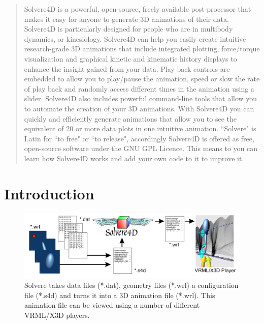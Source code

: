 \documentclass[singlecolumn,12pt]{article}
\begin{document}
\newpage
\begin{abstract}
Solvere4D is a powerful, open-source, freely available
post-processor that makes it easy for anyone to generate 3D
animations of their data. Solvere4D is particularly designed for
people who are in multibody dynamics, or kinesiology. Solvere4D can
help you easily create intuitive research-grade 3D animations that
include integrated plotting, force/torque visualization and
graphical kinetic and kinematic history displays to enhance the
insight gained from your data. Play back controls are embedded to
allow you to play/pause the animation, speed or slow the rate of
play back and randomly access different times in the animation using
a slider. Solvere4D also includes powerful command-line tools that
allow you to automate the creation of your 3D animations. With
Solvere4D you can quickly and efficiently generate animations that
allow you to see the equivalent of 20 or more data plots in one
intuitive animation. ``Solvere" is Latin for ``to free" or ``to
release", accordingly Solvere4D is offered as free, open-source
software under the GNU GPL Licence. This means to you can learn how
Solvere4D works and add your own code to it to improve it.
\end{abstract}

\newpage
\tableofcontents

\newpage
\section{Introduction}
\label{sec_Intro}

\begin{figure}[!h]
\includegraphics[width = \textwidth, height = \textheight, keepaspectratio= true]{fig_solvere_system}
\caption{Solvere takes data files (*.dat), geometry files (*.wrl) a
configuration file (*.s4d) and turns it into a 3D animation file
(*.wrl). This animation file can be viewed using a number of
different VRML/X3D players.\label{fig_solvere_system}}
\end{figure}
\end{document}
